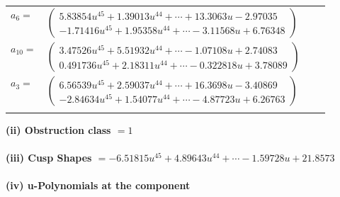\documentclass[1p]{elsarticle_modified}
\theoremstyle{definition}
\begin{document}
\begin{tabular}{m{7pt} m{180pt} m{7pt} m{180pt} }
\flushright $a_{6}=$&$\begin{pmatrix}5.83854 u^{45}+1.39013 u^{44}+\cdots+13.3063 u-2.97035\\-1.71416 u^{45}+1.95358 u^{44}+\cdots-3.11568 u+6.76348\end{pmatrix}$ \\
\flushright $a_{10}=$&$\begin{pmatrix}3.47526 u^{45}+5.51932 u^{44}+\cdots-1.07108 u+2.74083\\0.491736 u^{45}+2.18311 u^{44}+\cdots-0.322818 u+3.78089\end{pmatrix}$ \\
\flushright $a_{3}=$&$\begin{pmatrix}6.56539 u^{45}+2.59037 u^{44}+\cdots+16.3698 u-3.40869\\-2.84634 u^{45}+1.54077 u^{44}+\cdots-4.87723 u+6.26763\end{pmatrix}$\\&\end{tabular}
\flushleft \textbf{(ii) Obstruction class $= 1$}\\~\\
\flushleft \textbf{(iii) Cusp Shapes $= -6.51815 u^{45}+4.89643 u^{44}+\cdots-1.59728 u+21.8573$}\\~\\
\newpage\renewcommand{\arraystretch}{1}
\flushleft \textbf{(iv) u-Polynomials at the component}\newline \\
\end{document}
